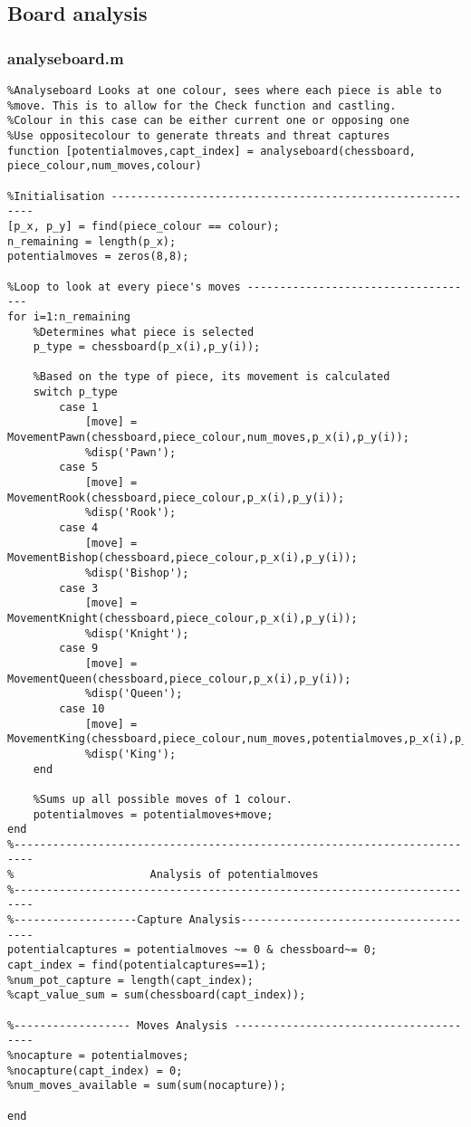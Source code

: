 \documentclass{article}
\begin{document}
\subsection{Board analysis}
\subsubsection{analyseboard.m}
\begin{lstlisting}
%Analyseboard Looks at one colour, sees where each piece is able to
%move. This is to allow for the Check function and castling.
%Colour in this case can be either current one or opposing one
%Use oppositecolour to generate threats and threat captures
function [potentialmoves,capt_index] = analyseboard(chessboard, piece_colour,num_moves,colour)

%Initialisation ----------------------------------------------------------
[p_x, p_y] = find(piece_colour == colour);
n_remaining = length(p_x);
potentialmoves = zeros(8,8);

%Loop to look at every piece's moves ------------------------------------
for i=1:n_remaining
    %Determines what piece is selected
    p_type = chessboard(p_x(i),p_y(i)); 
    
    %Based on the type of piece, its movement is calculated
    switch p_type
        case 1
            [move] = MovementPawn(chessboard,piece_colour,num_moves,p_x(i),p_y(i));
            %disp('Pawn');
        case 5
            [move] = MovementRook(chessboard,piece_colour,p_x(i),p_y(i));
            %disp('Rook');
        case 4
            [move] = MovementBishop(chessboard,piece_colour,p_x(i),p_y(i));
            %disp('Bishop');
        case 3
            [move] = MovementKnight(chessboard,piece_colour,p_x(i),p_y(i));
            %disp('Knight');
        case 9
            [move] = MovementQueen(chessboard,piece_colour,p_x(i),p_y(i));
            %disp('Queen');
        case 10
            [move] = MovementKing(chessboard,piece_colour,num_moves,potentialmoves,p_x(i),p_y(i));
            %disp('King');
    end
    
    %Sums up all possible moves of 1 colour.
    potentialmoves = potentialmoves+move;
end
%-------------------------------------------------------------------------
%                     Analysis of potentialmoves
%-------------------------------------------------------------------------
%-------------------Capture Analysis--------------------------------------
potentialcaptures = potentialmoves ~= 0 & chessboard~= 0;
capt_index = find(potentialcaptures==1);
%num_pot_capture = length(capt_index);
%capt_value_sum = sum(chessboard(capt_index));

%------------------ Moves Analysis ---------------------------------------
%nocapture = potentialmoves;
%nocapture(capt_index) = 0;
%num_moves_available = sum(sum(nocapture));

end
\end{lstlisting}
\end{document}
